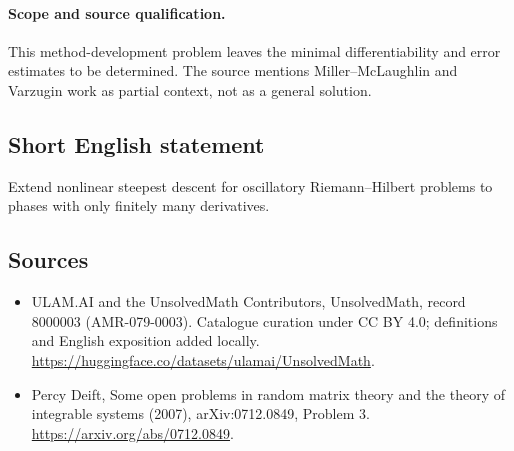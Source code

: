 \documentclass[11pt]{article}
\begin{document}
\paragraph{Scope and source qualification.}This method-development problem leaves the minimal differentiability and error estimates to be determined. The source mentions Miller--McLaughlin and Varzugin work as partial context, not as a general solution.
\subsection{Short English statement}
Extend nonlinear steepest descent for oscillatory Riemann--Hilbert problems to phases with only finitely many derivatives.
\subsection{Sources}
\begin{itemize}
\item[\hypertarget{source:8000003:1}{S1}] ULAM.AI and the UnsolvedMath Contributors, UnsolvedMath, record 8000003 (AMR-079-0003). Catalogue curation under CC BY 4.0; definitions and English exposition added locally.
\url{https://huggingface.co/datasets/ulamai/UnsolvedMath}.
\item[\hypertarget{source:8000003:2}{S2}] Percy Deift, Some open problems in random matrix theory and the theory of integrable systems (2007), arXiv:0712.0849, Problem 3.
\url{https://arxiv.org/abs/0712.0849}.
\end{itemize}
\label{end:8000003}
\end{document}
